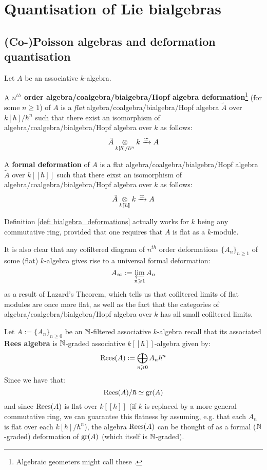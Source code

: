 \section{Quantisation of Lie bialgebras}
    \subsection{(Co-)Poisson algebras and deformation quantisation}
        \begin{definition}[Deformations] \label{def: bialgebra_deformations}
            Let $A$ be an associative $k$-algebra.
            
            A \textbf{$n^{th}$ order algebra/coalgebra/bialgebra/Hopf algebra deformation}\footnote{Algebraic geometers might call these .} (for some $n \geq 1$) of $A$ is a \textit{flat} algebra/coalgebra/bialgebra/Hopf algebra $\tilde{A}$ over $k[\hbar]/\hbar^n$ such that there exist an isomorphism of algebra/coalgebra/bialgebra/Hopf algebra over $k$ as follows:
                $$\tilde{A} \tensor_{k[\hbar]/\hbar^n} k \xrightarrow[]{\cong} A$$
                
            A \textbf{formal deformation} of $A$ is a flat algebra/coalgebra/bialgebra/Hopf algebra $\tilde{A}$ over $k[\![\hbar]\!]$ such that there eixst an isomorphism of algebra/coalgebra/bialgebra/Hopf algebra over $k$ as follows:
                $$\tilde{A} \tensor_{k[\![\hbar]\!]} k \xrightarrow[]{\cong} A$$
        \end{definition}
        \begin{remark}
            Definition \ref{def: bialgebra_deformations} actually works for $k$ being any commutative ring, provided that one requires that $A$ is flat as a $k$-module. 
            
            It is also clear that any cofiltered diagram of $n^{th}$ order deformations $\{A_n\}_{n \geq 1}$ of some (flat) $k$-algebra gives rise to a universal formal deformation:
                $$A_{\infty} := \projlim_{n \geq 1} A_n$$
            as a result of Lazard's Theorem, which tells us that cofiltered limits of flat modules are once more flat, as well as the fact that the categories of algebra/coalgebra/bialgebra/Hopf algebra over $k$ has all small cofiltered limits. 
        \end{remark}
        \begin{example} \label{example: rees_algebras_as_formal_flat_deformations}
            Let $A := \{A_n\}_{n \geq 0}$ be an $\N$-filtered associative $k$-algebra recall that its associated \textbf{Rees algebra} is $\N$-graded associative $k[\![\hbar]\!]$-algebra given by:
                $$\Rees(A) := \bigoplus_{n \geq 0} A_n \hbar^n$$
            Since we have that:
                $$\Rees(A)/\hbar \cong \gr(A)$$
            and since $\Rees(A)$ is flat over $k[\![\hbar]\!]$ (if $k$ is replaced by a more general commutative ring, we can guarantee this flatness by assuming, e.g. that each $A_n$ is flat over each $k[\hbar]/\hbar^n$), the algebra $\Rees(A)$ can be thought of as a formal ($\N$-graded) deformation of $\gr(A)$ (which itself is $\N$-graded). 
        \end{example}

